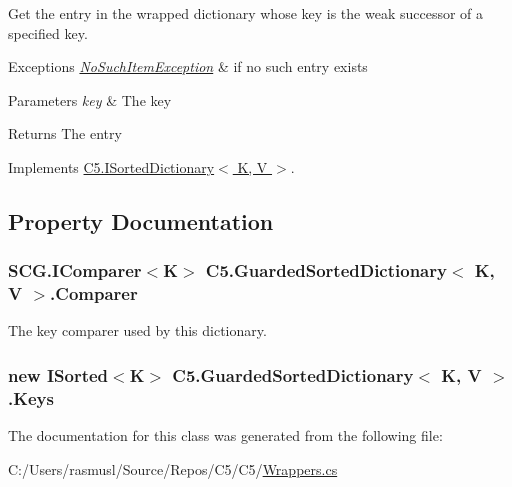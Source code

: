 Get the entry in the wrapped dictionary whose key is the weak successor of a specified key. 


\begin{DoxyExceptions}{Exceptions}
{\em \hyperlink{class_c5_1_1_no_such_item_exception}{No\+Such\+Item\+Exception}} & if no such entry exists \\
\hline
\end{DoxyExceptions}

\begin{DoxyParams}{Parameters}
{\em key} & The key\\
\hline
\end{DoxyParams}
\begin{DoxyReturn}{Returns}
The entry
\end{DoxyReturn}


Implements \hyperlink{interface_c5_1_1_i_sorted_dictionary_a3829a2cfb58bc90c600eb2fcc12e1d25}{C5.\+I\+Sorted\+Dictionary$<$ K, V $>$}.



\subsection{Property Documentation}
\hypertarget{class_c5_1_1_guarded_sorted_dictionary_a8ad47ad9b7269053670c95950fd8feff}{}
\subsubsection[{Comparer}]{\setlength{\rightskip}{0pt plus 5cm}S\+C\+G.\+I\+Comparer$<$K$>$ {\bf C5.\+Guarded\+Sorted\+Dictionary}$<$ K, V $>$.Comparer\hspace{0.3cm}{\ttfamily [get]}}\label{class_c5_1_1_guarded_sorted_dictionary_a8ad47ad9b7269053670c95950fd8feff}


The key comparer used by this dictionary. 

\hypertarget{class_c5_1_1_guarded_sorted_dictionary_ac122f90f3bc375a5d0a6d12e15d582bb}{}
\subsubsection[{Keys}]{\setlength{\rightskip}{0pt plus 5cm}new {\bf I\+Sorted}$<$K$>$ {\bf C5.\+Guarded\+Sorted\+Dictionary}$<$ K, V $>$.Keys\hspace{0.3cm}{\ttfamily [get]}}\label{class_c5_1_1_guarded_sorted_dictionary_ac122f90f3bc375a5d0a6d12e15d582bb}






The documentation for this class was generated from the following file\+:\begin{DoxyCompactItemize}
\item 
C\+:/\+Users/rasmusl/\+Source/\+Repos/\+C5/\+C5/\hyperlink{_wrappers_8cs}{Wrappers.\+cs}\end{DoxyCompactItemize}
